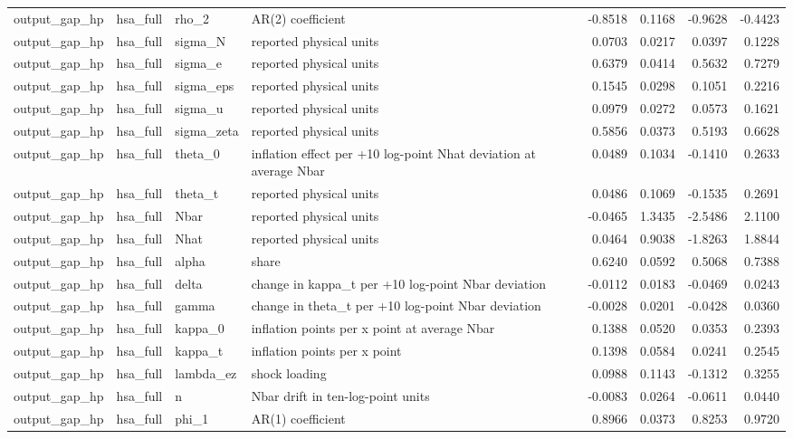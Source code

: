 \begin{tabular}{llllrrrr}
output\_gap\_hp & hsa\_full & rho\_2 & AR(2) coefficient & -0.8518 & 0.1168 & -0.9628 & -0.4423 \\
output\_gap\_hp & hsa\_full & sigma\_N & reported physical units & 0.0703 & 0.0217 & 0.0397 & 0.1228 \\
output\_gap\_hp & hsa\_full & sigma\_e & reported physical units & 0.6379 & 0.0414 & 0.5632 & 0.7279 \\
output\_gap\_hp & hsa\_full & sigma\_eps & reported physical units & 0.1545 & 0.0298 & 0.1051 & 0.2216 \\
output\_gap\_hp & hsa\_full & sigma\_u & reported physical units & 0.0979 & 0.0272 & 0.0573 & 0.1621 \\
output\_gap\_hp & hsa\_full & sigma\_zeta & reported physical units & 0.5856 & 0.0373 & 0.5193 & 0.6628 \\
output\_gap\_hp & hsa\_full & theta\_0 & inflation effect per +10 log-point Nhat deviation at average Nbar & 0.0489 & 0.1034 & -0.1410 & 0.2633 \\
output\_gap\_hp & hsa\_full & theta\_t & reported physical units & 0.0486 & 0.1069 & -0.1535 & 0.2691 \\
output\_gap\_hp & hsa\_full & Nbar & reported physical units & -0.0465 & 1.3435 & -2.5486 & 2.1100 \\
output\_gap\_hp & hsa\_full & Nhat & reported physical units & 0.0464 & 0.9038 & -1.8263 & 1.8844 \\
output\_gap\_hp & hsa\_full & alpha & share & 0.6240 & 0.0592 & 0.5068 & 0.7388 \\
output\_gap\_hp & hsa\_full & delta & change in kappa\_t per +10 log-point Nbar deviation & -0.0112 & 0.0183 & -0.0469 & 0.0243 \\
output\_gap\_hp & hsa\_full & gamma & change in theta\_t per +10 log-point Nbar deviation & -0.0028 & 0.0201 & -0.0428 & 0.0360 \\
output\_gap\_hp & hsa\_full & kappa\_0 & inflation points per x point at average Nbar & 0.1388 & 0.0520 & 0.0353 & 0.2393 \\
output\_gap\_hp & hsa\_full & kappa\_t & inflation points per x point & 0.1398 & 0.0584 & 0.0241 & 0.2545 \\
output\_gap\_hp & hsa\_full & lambda\_ez & shock loading & 0.0988 & 0.1143 & -0.1312 & 0.3255 \\
output\_gap\_hp & hsa\_full & n & Nbar drift in ten-log-point units & -0.0083 & 0.0264 & -0.0611 & 0.0440 \\
output\_gap\_hp & hsa\_full & phi\_1 & AR(1) coefficient & 0.8966 & 0.0373 & 0.8253 & 0.9720 \\

\end{tabular}
